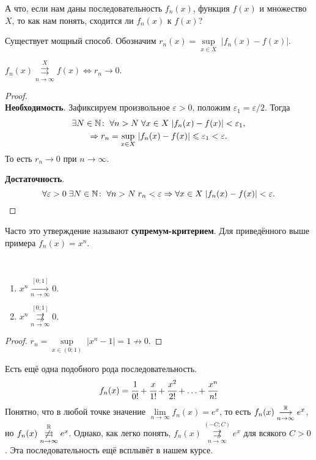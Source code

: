 \documentclass[a4paper, 12pt]{article}
\begin{document}
	А что, если нам даны последовательность $f_n(x)$, функция $f(x)$ и множество $X$, то как нам понять, сходится ли $f_n(x)$ к $f(x)$?
	
	Существует мощный способ. Обозначим $r_n(x) =\underset{x \in X}{\sup}\;|f_n(x) - f(x)|$.
	\begin{Statement}
		$f_n(x)\overset{X}{\underset{n\to\infty}{\rightrightarrows}} f(x) \Leftrightarrow r_n\to 0$.
	\end{Statement}
	\begin{proof}\ \\
		\textbf{Необходимость}. Зафиксируем произвольное $\varepsilon > 0$, положим $\varepsilon_1 = \varepsilon/2$. Тогда
		\begin{gather*}
			\exists N\in \mathbb{N} \colon\; \forall n>N\; \forall x \in X\; |f_n(x) - f(x)| < \varepsilon_1,\\
			\Rightarrow r_n =  \underset{x \in X}{\sup}\; |f_n(x) - f(x)| \leqslant \varepsilon_1 < \varepsilon.
		\end{gather*}
		То есть $r_n \to 0$ при $n\to \infty$.
		\par \textbf{Достаточность}.
		$$
		\forall \varepsilon > 0\; \exists N \in \mathbb{N}\colon \; \forall n>N\; r_n < \varepsilon \Rightarrow \forall x \in X\; |f_n(x) - f(x)| < \varepsilon.
		$$
	\end{proof}
	Часто это утверждение называют \textbf{супремум-критерием}. Для приведённого выше примера $f_n(x) = x^n$.
	\begin{Statement}\ \\		
		\begin{enumerate}
			\item $x^n \overset{[0;1]}{\underset{n\to\infty}{\longrightarrow}} 0$.
			\item $x^n \overset{[0;1]}{\underset{n\to\infty}{\not\rightrightarrows}} 0$.
		\end{enumerate}
	\end{Statement}
	\begin{proof}
		$r_n = \underset{x\in(0;1)}{\sup}\;|x^n - 1| = 1 \not\to 0$.
	\end{proof}
	Есть ещё одна подобного рода последовательность.
	$$
		f_n(x) = \cfrac{1}{0!} + \cfrac{x}{1!} + \cfrac{x^2}{2!} + \ldots + \cfrac{x^n}{n!}
	$$
	Понятно, что в любой точке значение $\lim\limits_{n \to \infty} f_n(x) = e^x$, то есть 	$f_n(x) \overset{\mathbb{R}}{\underset{n\to\infty}{\longrightarrow}} e^x$, но $f_n(x) \overset{\mathbb{R}}{\underset{n\to\infty}{\not\rightrightarrows}} e^x$. Однако, как легко понять, $f_n(x) \overset{(-C;C)}{\underset{n\to\infty}{\not\rightrightarrows}} e^x$ для всякого $C>0$. Эта последовательность ещё всплывёт в нашем курсе.
\end{document}
